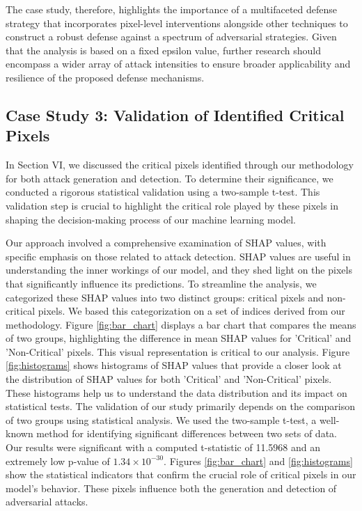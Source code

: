 \documentclass[10pt, conference, a4paper, final]{IEEEtran}
\begin{document}
The case study, therefore, highlights the importance of a multifaceted defense strategy that incorporates pixel-level interventions alongside other techniques to construct a robust defense against a spectrum of adversarial strategies. Given that the analysis is based on a fixed epsilon value, further research should encompass a wider array of attack intensities to ensure broader applicability and resilience of the proposed defense mechanisms.
  

  \subsection{Case Study 3: Validation of Identified Critical Pixels}
    In Section VI, we discussed the critical pixels identified through our methodology for both attack generation and detection. To determine their significance, we conducted a rigorous statistical validation using a two-sample t-test. This validation step is crucial to highlight the critical role played by these pixels in shaping the decision-making process of our machine learning model.

    Our approach involved a comprehensive examination of SHAP values, with specific emphasis on those related to attack detection. SHAP values are useful in understanding the inner workings of our model, and they shed light on the pixels that significantly influence its predictions. To streamline the analysis, we categorized these SHAP values into two distinct groups: critical pixels and non-critical pixels. We based this categorization on a set of indices derived from our methodology.
    Figure \ref{fig:bar_chart} displays a bar chart that compares the means of two groups, highlighting the difference in mean SHAP values for 'Critical' and 'Non-Critical' pixels. This visual representation is critical to our analysis.   
    Figure \ref{fig:histograms} shows histograms of SHAP values that provide a closer look at the distribution of SHAP values for both 'Critical' and 'Non-Critical' pixels. These histograms help us to understand the data distribution and its impact on statistical tests.    
    The validation of our study primarily depends on the comparison of two groups using statistical analysis. We used the two-sample t-test, a well-known method for identifying significant differences between two sets of data. Our results were significant with a computed t-statistic of 11.5968 and an extremely low p-value of $1.34 \times 10^{-30}$. Figures \ref{fig:bar_chart} and \ref{fig:histograms} show the statistical indicators that confirm the crucial role of critical pixels in our model's behavior. These pixels influence both the generation and detection of adversarial attacks.
    
\end{document}
